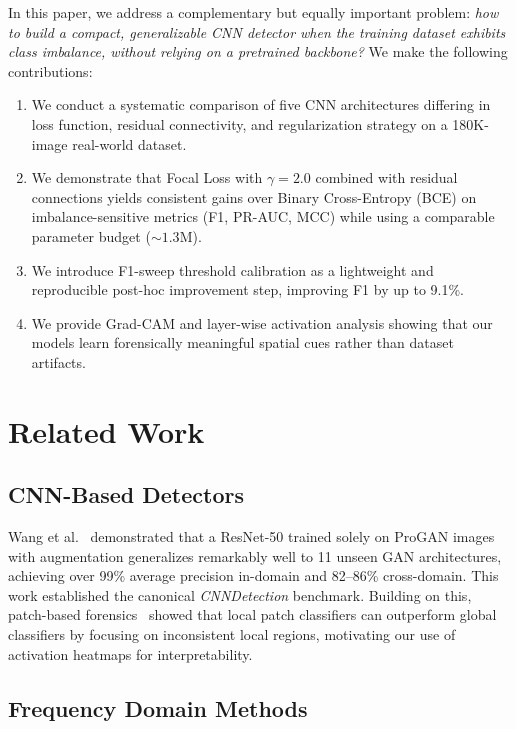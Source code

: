 \documentclass[10pt,twocolumn]{article}
\begin{document}
In this paper, we address a complementary but equally important problem:
\emph{how to build a compact, generalizable CNN detector when the training dataset
exhibits class imbalance, without relying on a pretrained backbone?}
We make the following contributions:

\begin{enumerate}[leftmargin=1.3em, itemsep=0pt]
  \item We conduct a systematic comparison of five CNN architectures differing in
  loss function, residual connectivity, and regularization strategy on a
  180K-image real-world dataset.
  \item We demonstrate that Focal Loss with $\gamma{=}2.0$ combined with residual
  connections yields consistent gains over Binary Cross-Entropy (BCE) on
  imbalance-sensitive metrics (F1, PR-AUC, MCC) while using a comparable
  parameter budget (${\sim}1.3$M).
  \item We introduce F1-sweep threshold calibration as a lightweight and
  reproducible post-hoc improvement step, improving F1 by up to 9.1\%.
  \item We provide Grad-CAM and layer-wise activation analysis showing that
  our models learn forensically meaningful spatial cues rather than dataset
  artifacts.
\end{enumerate}

\section{Related Work}
\label{sec:related}

\subsection{CNN-Based Detectors}

Wang et al.~\cite{wang2020cnn} demonstrated that a ResNet-50 trained solely on
ProGAN images with augmentation generalizes remarkably well to 11 unseen GAN
architectures, achieving over 99\% average precision in-domain and 82--86\%
cross-domain. This work established the canonical \emph{CNNDetection} benchmark.
Building on this, patch-based forensics~\cite{chai2020makes} showed that
local patch classifiers can outperform global classifiers by focusing on
inconsistent local regions, motivating our use of activation heatmaps
for interpretability.

\subsection{Frequency Domain Methods}
\end{document}
